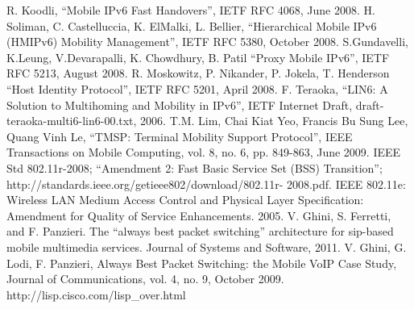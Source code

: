 \begin{thebibliography}{90}
 R. Koodli, ``Mobile IPv6 Fast Handovers'', IETF RFC 4068, June 2008.
  H. Soliman, C. Castelluccia, K. ElMalki, L. Bellier, ``Hierarchical Mobile IPv6 (HMIPv6) Mobility Management'', IETF RFC 5380, October 2008.
 S.Gundavelli, K.Leung, V.Devarapalli, K. Chowdhury, B. Patil ``Proxy Mobile IPv6'', IETF RFC 5213, August 2008.
 R. Moskowitz, P. Nikander, P. Jokela, T. Henderson ``Host Identity Protocol'', IETF RFC 5201, April 2008. 
 F. Teraoka, ``LIN6: A Solution to Multihoming and Mobility in IPv6'', IETF Internet Draft, draft-teraoka-multi6-lin6-00.txt, 2006.
	T.M. Lim, Chai Kiat Yeo, Francis Bu Sung Lee, Quang Vinh Le, ``TMSP: Terminal Mobility Support Protocol'', IEEE Transactions on Mobile Computing, vol. 8, no. 6, pp. 849-863, June 2009.
 IEEE Std 802.11r-2008; ``Amendment 2: Fast Basic Service Set (BSS) Transition''; http://standards.ieee.org/getieee802/download/802.11r- 2008.pdf.
 IEEE 802.11e: Wireless LAN Medium Access Control and Physical Layer Specification: Amendment for Quality of Service Enhancements. 2005.
 V. Ghini, S. Ferretti, and F. Panzieri. The ``always best packet switching'' architecture for sip-based mobile multimedia services. Journal of Systems and Software, 2011.
 V. Ghini, G. Lodi, F. Panzieri, Always Best Packet Switching: the Mobile VoIP Case Study, Journal of Communications, vol. 4, no. 9, October 2009.
 http://lisp.cisco.com/lisp\_over.html
\end{thebibliography}

